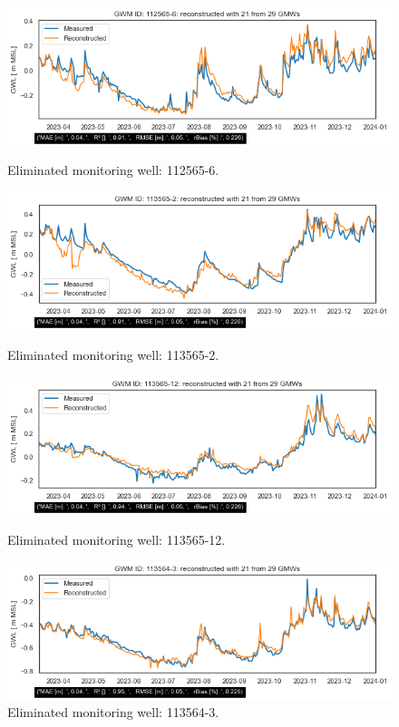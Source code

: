 \begin{figure}[h]
    \begin{minipage}{0.48\textwidth}
        \centering
        \includegraphics[width=\linewidth]{frontmatter/Rozenburg-fig/1125656roz.png}
        \caption{Eliminated monitoring well: 112565-6.}
        \label{112565-6}
    \end{minipage}\hfill
    \begin{minipage}{0.48\textwidth}
        \centering
        \includegraphics[width=\linewidth]{frontmatter/Rozenburg-fig/1135652roz.png}
        \caption{Eliminated monitoring well: 113565-2.}
        \label{113565-2}
    \end{minipage}
    \begin{minipage}{0.48\textwidth}
        \centering
        \includegraphics[width=\linewidth]{frontmatter/Rozenburg-fig/11356512roz.png}
        \caption{Eliminated monitoring well: 113565-12.}
        \label{113565-12}
    \end{minipage}\hfill
    \begin{minipage}{0.48\textwidth}
        \centering
        \includegraphics[width=\linewidth]{frontmatter/Rozenburg-fig/1135643roz.png}
        \caption{Eliminated monitoring well: 113564-3.}
        \label{113564-3}
    \end{minipage}


\end{figure}
